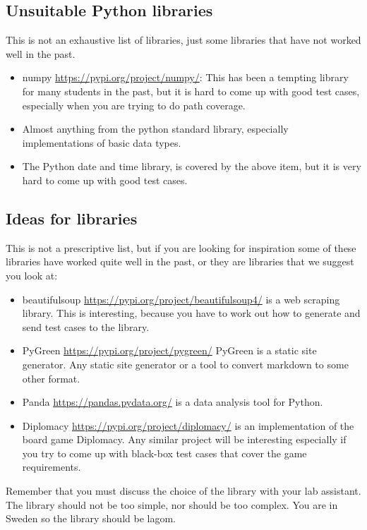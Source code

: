 \documentclass[a4paper]{article}
\begin{document}
\subsection*{Unsuitable Python libraries}
This is not an exhaustive list of libraries, just some libraries that
have not worked well in the past.
\begin{itemize}
\item numpy \url{https://pypi.org/project/numpy/}: This has been a
  tempting library for many students in the past, but it is hard to
  come up with good test cases, especially when you are trying to do
  path coverage.
\item Almost anything from the python standard library, especially
  implementations of basic data types.
\item The Python date and time library, is covered by the above item,
  but it is very hard to come up with good test cases.
  
\end{itemize}



\subsection*{Ideas for libraries}
This is not a prescriptive list, but if you are looking for
inspiration some of these libraries have worked quite well in the
past, or they are libraries that we suggest you look at:

\begin{itemize}
\item beautifulsoup \url{https://pypi.org/project/beautifulsoup4/}
  is a web scraping library. This is interesting, because you have to
  work out how to generate and send test cases to the library.
\item PyGreen \url{https://pypi.org/project/pygreen/} PyGreen is a
  static site generator. Any static site generator or a tool to
  convert markdown to some other format. 
\item Panda \url{https://pandas.pydata.org/} is a data analysis tool
  for Python.
\item Diplomacy \url{https://pypi.org/project/diplomacy/} is an
  implementation of the board game Diplomacy. Any similar project will
  be interesting especially if you try to come up with black-box test
  cases that cover the game requirements.
\end{itemize}

Remember that you must discuss the choice of the library with your lab
assistant. The library should not be too simple, nor should be too
complex. You are in Sweden so the library should be lagom.
\end{document}
